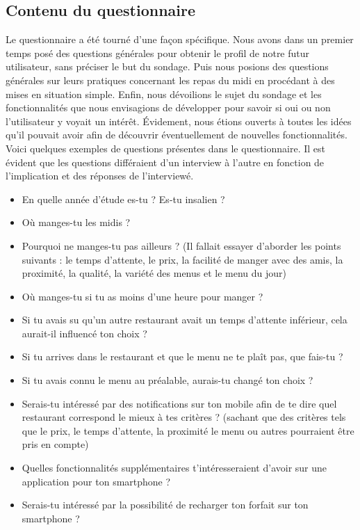 \subsection{Contenu du questionnaire}
Le questionnaire a été tourné d'une façon spécifique. Nous avons dans un 
premier temps posé des questions générales pour obtenir le profil de notre
futur utilisateur, sans préciser le but du sondage. Puis nous posions 
des questions générales sur leurs pratiques concernant les repas du midi
en procédant à des mises en situation simple. Enfin, nous dévoilions le
sujet du sondage et les fonctionnalités que nous envisagions de
développer pour savoir si oui ou non l'utilisateur y voyait un intérêt. 
Évidement, nous étions ouverts à toutes les idées qu'il pouvait avoir
afin de découvrir éventuellement de nouvelles fonctionnalités. \\
Voici quelques exemples de questions présentes dans le questionnaire. 
Il est évident que les questions différaient d'un interview à 
l'autre en fonction de l'implication et des réponses de l'interviewé. 
\begin{itemize}
\item En quelle année d'étude es-tu ? Es-tu insalien ?
\item Où manges-tu les midis ?
\item Pourquoi ne manges-tu pas ailleurs ? (Il fallait essayer d'aborder les points
suivants : le temps d'attente, le prix, la facilité de manger avec des amis,
la proximité, la qualité, la variété des menus et le menu du jour)
\item Où manges-tu si tu as moins d'une heure pour manger ?
\item Si tu avais su qu'un autre restaurant avait un temps d'attente inférieur, 
cela aurait-il influencé ton choix ? 
\item Si tu arrives dans le restaurant et que le menu ne te plaît pas,
que fais-tu ?
\item Si tu avais connu le menu au préalable, aurais-tu changé ton choix ?
\item Serais-tu intéressé par des notifications sur ton mobile afin de te dire 
quel restaurant correspond le mieux à tes critères ? (sachant que des 
critères tels que le prix, le temps d'attente, la proximité le menu ou autres
pourraient être pris en compte)
\item Quelles fonctionnalités supplémentaires t'intéresseraient d'avoir sur 
une application pour ton smartphone ?
\item Serais-tu intéressé par la possibilité de recharger ton forfait sur ton smartphone ?
\end{itemize}


